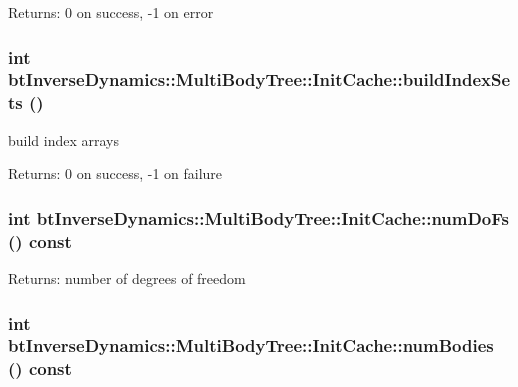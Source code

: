 \begin{Desc}
\item[Returns:]0 on success, -1 on error \end{Desc}
 \hypertarget{classbt_inverse_dynamics_1_1_multi_body_tree_1_1_init_cache_41e961d85dcd9e9f9aa9b18ac33289c9}{
\subsubsection[buildIndexSets]{\setlength{\rightskip}{0pt plus 5cm}int btInverseDynamics::MultiBodyTree::InitCache::buildIndexSets ()}}
\label{classbt_inverse_dynamics_1_1_multi_body_tree_1_1_init_cache_41e961d85dcd9e9f9aa9b18ac33289c9}


build index arrays \begin{Desc}
\item[Returns:]0 on success, -1 on failure \end{Desc}
\hypertarget{classbt_inverse_dynamics_1_1_multi_body_tree_1_1_init_cache_38d366cfeb082b06f72eff27befae30b}{
\subsubsection[numDoFs]{\setlength{\rightskip}{0pt plus 5cm}int btInverseDynamics::MultiBodyTree::InitCache::numDoFs () const}}
\label{classbt_inverse_dynamics_1_1_multi_body_tree_1_1_init_cache_38d366cfeb082b06f72eff27befae30b}


\begin{Desc}
\item[Returns:]number of degrees of freedom \end{Desc}
\hypertarget{classbt_inverse_dynamics_1_1_multi_body_tree_1_1_init_cache_6203870a6e9093f6c26280feaee27832}{
\subsubsection[numBodies]{\setlength{\rightskip}{0pt plus 5cm}int btInverseDynamics::MultiBodyTree::InitCache::numBodies () const}}
\label{classbt_inverse_dynamics_1_1_multi_body_tree_1_1_init_cache_6203870a6e9093f6c26280feaee27832}


